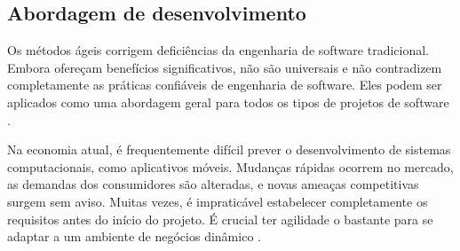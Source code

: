 
\subsection{Abordagem de desenvolvimento}


Os métodos ágeis corrigem deficiências da engenharia de software tradicional.
Embora ofereçam benefícios significativos, não são universais e não contradizem completamente as práticas confiáveis de engenharia de software. Eles podem ser aplicados como uma abordagem geral para todos os tipos de projetos de software \cite{pressman}.

Na economia atual, é frequentemente difícil prever o desenvolvimento de sistemas computacionais, como aplicativos móveis. Mudanças rápidas ocorrem no mercado, as demandas dos consumidores são alteradas, e novas ameaças competitivas surgem sem aviso. Muitas vezes, é impraticável estabelecer completamente os requisitos antes do início do projeto. É crucial ter agilidade o bastante para se adaptar a um ambiente de negócios dinâmico \cite{pressman}.

